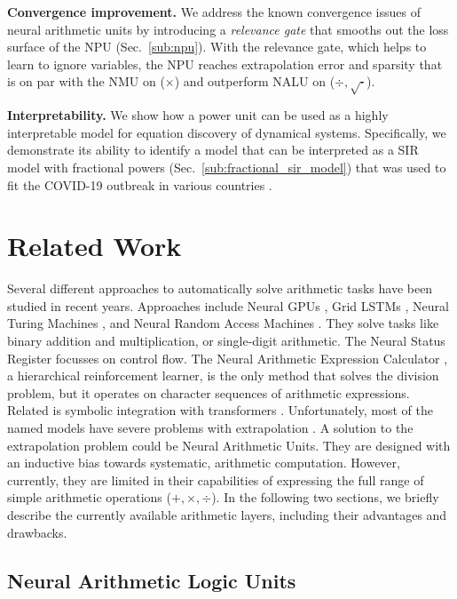 \documentclass[9pt]{article}
\begin{document}
\textbf{Convergence improvement.}
We address the known convergence issues of neural arithmetic units by
introducing a \emph{relevance gate} that smooths out the loss surface of the
NPU (Sec.~\ref{sub:npu}). With the relevance gate, which helps to learn to
ignore variables, the NPU reaches extrapolation error and sparsity that is on
par with the NMU on ($\times$) and outperform NALU on ($\div,\sqrt{\cdot}$).

\textbf{Interpretability.}
We show how a power unit can be used as a highly interpretable model for equation discovery
of dynamical systems. Specifically, we demonstrate its ability to identify
a model that can be interpreted as a SIR model with fractional powers
(Sec.~\ref{sub:fractional_sir_model}) that was used to fit the COVID-19
outbreak in various countries \citep{taghvaei_fractional_2020}.

\section{Related Work}%
\label{sec:related_work}

Several different approaches to automatically solve arithmetic tasks have
been studied in recent years. Approaches include Neural GPUs
\citep{kaiser_neural_2016}, Grid LSTMs \citep{kalchbrenner_grid_2016}, Neural
Turing Machines \citep{graves_neural_2014}, and Neural Random Access Machines
\citep{kurach_neural_2016}. They solve tasks like binary addition and
multiplication, or single-digit arithmetic. The Neural Status Register
\citep{faber_neural_2020} focusses on control flow.  The Neural Arithmetic
Expression Calculator \citep{chen_neural_2018}, a hierarchical reinforcement
learner, is the only method that solves the division problem, but it operates on
character sequences of arithmetic expressions. Related is symbolic integration
with transformers \citep{lample_deep_2019}. Unfortunately, most of the named models
have severe problems with extrapolation \citep{madsen_measuring_2019,saxton_analysing_2019}.
A solution to the extrapolation problem could be Neural Arithmetic Units. They are
designed with an inductive bias towards systematic, arithmetic computation.
However, currently, they are limited in their capabilities of expressing the full
range of simple arithmetic operations ($+,\times,\div$).
In the following two sections, we briefly describe the currently available
arithmetic layers, including their advantages and drawbacks.

\subsection{Neural Arithmetic Logic Units}%
\label{sub:neural_arithmetic_logic_unit}
\end{document}

